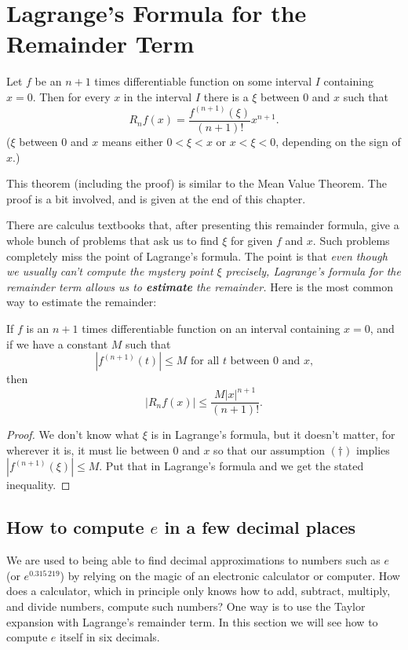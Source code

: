 \section{Lagrange's Formula for the Remainder Term} %
\label{sec:lagr-form-rema}


\begin{theorem}
  Let $f$ be an $n+1$ times differentiable function on some interval $I$
  containing $x=0$. Then for every $x$ in the interval $I$ there is a $\xi$
  between $0$ and $x$ such that
  \[
  R_n f(x) = \frac{f^{(n+1)} (\xi)}{(n+1)!}x^{n+1}.
  \]
  ($\xi$ between $0$ and $x$ means either $0<\xi<x$ or $x<\xi<0$, depending
  on the sign of $x$.)
\end{theorem}

This theorem (including the proof) is similar to the Mean Value
Theorem. The proof is a bit involved, and is given at the end of this
chapter.


There are calculus textbooks that, after presenting this remainder formula, give
a whole bunch of problems that ask us to find $\xi$ for given $f$ and $x$.  Such
problems completely miss the point of Lagrange's formula.  The point is that
\textit{even though we usually can't compute the mystery point $\xi$ precisely,
Lagrange's formula for the remainder term allows us to \textbf{estimate} the
remainder.}
Here is the most common way to estimate the remainder:
\begin{theorem}
  If $f$ is an $n+1$ times differentiable function on an interval
  containing $x=0$, and if we have a constant $M$ such that
  \begin{equation}
    \left|f^{(n+1)} (t)\right|\leq M
    \text{ for all $t$ between $0$ and $x$,} \tag{\dag}
  \end{equation}
  then
  \[
  |R_nf(x)|\leq \frac {M|x|^{n+1}}{(n+1)!}.
  \]
\end{theorem}
\begin{proof}
  We don't know what $\xi$ is in Lagrange's formula, but it doesn't matter,
  for wherever it is, it must lie between $0$ and $x$ so that our
  assumption $(\dag)$ implies $|f^{(n+1)} (\xi)|\leq M$. Put that in
  Lagrange's formula and we  get the stated inequality.
\end{proof}

\subsection{How to compute $e$ in a few decimal places}  %
We are used to being able to find decimal approximations to numbers such as
$e$ (or $e^{0.315\,219}$) by relying on the magic of an electronic calculator or
computer.  How does a calculator, which in principle only knows how to add,
subtract, multiply, and divide numbers, compute such numbers?  One way is 
to use the Taylor expansion with Lagrange's remainder term.  In this section we
will see how to compute $e$ itself in six decimals.

